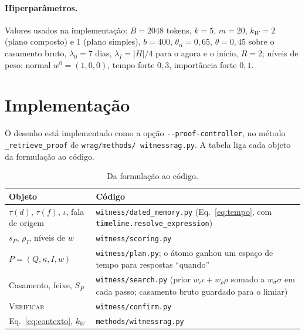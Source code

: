 \documentclass[11pt]{article}
\theoremstyle{definition}
\theoremstyle{plain}
\newcommand{\op}[1]{\textsc{#1}}
\begin{document}
\paragraph{Hiperparâmetros.} Valores usados na implementação:
$B=2048$ tokens, $k=5$, $m=20$, $k_W=2$ (plano composto) e $1$ (plano
simples), $b=400$, $\theta_\alpha=0{,}65$, $\theta=0{,}45$ sobre o casamento
bruto, $\lambda_0=7$ dias, $\lambda_I=|H|/4$ para o agora e o início, $R=2$;
níveis de peso: normal $w^0=(1,0,0)$, tempo forte $0{,}3$, importância forte
$0{,}1$.

\appendix
\section{Implementação}

O desenho está implementado como a opção \texttt{-{}-proof-controller}, no
método \texttt{\_retrieve\_proof} de \texttt{wrag/\allowbreak methods/\allowbreak
witnessrag.py}. A tabela liga cada objeto da formulação ao código.

\begin{table}[H]
\centering
\small
\begin{tabularx}{\textwidth}{@{}l Y@{}}
\toprule
Objeto & Código \\
\midrule
$\tau(d)$, $\tau(f)$, $\iota$, fala de origem & \texttt{witness/dated\_memory.py} (Eq.~\eqref{eq:tempo}, com \texttt{timeline.resolve\_expression}) \\
$s_P$, $\rho_I$, níveis de $w$ & \texttt{witness/scoring.py} \\
$P=(Q,\kappa,I,w)$ & \texttt{witness/plan.py}; o átomo ganhou um espaço de tempo para respostas ``quando'' \\
Casamento, feixe, $S_P$ & \texttt{witness/search.py} (prior $w_\iota\iota+w_\rho\rho$ somado a $w_\sigma\sigma$ em cada passo; casamento bruto guardado para o limiar) \\
\op{Verificar} & \texttt{witness/confirm.py} \\
Eq.~\eqref{eq:contexto}, $k_W$ & \texttt{methods/witnessrag.py} \\
\bottomrule
\end{tabularx}
\caption{Da formulação ao código.}
\label{tab:mapa}
\end{table}



\end{document}
